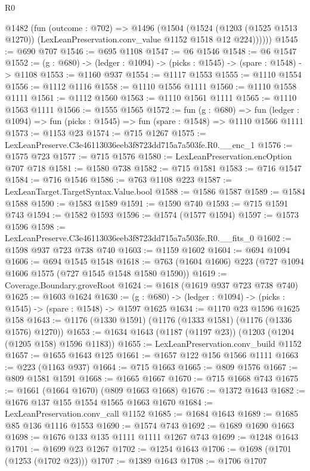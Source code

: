 \begin{lexlean}{R0}
\begin{coremodule}
      @1482
        (fun (outcome : @702) =>
        @1496
          (@1504
            (@1524
              (@1203 (@1525 @1513 @1270))
              (LexLeanPreservation.conv_value @1152 @1518 @12 @224))))))
@1545 := @690 @707
@1546 := @695 @1108
@1547 := @6 @1546
@1548 := @6 @1547
@1552 := (g : @680) -> (ledger : @1094) -> (picks : @1545) -> (spare : @1548) -> @1108
@1553 := @1160 @937
@1554 := @1117 @1553
@1555 := @1110 @1554
@1556 := @1112 @1116
@1558 := @1110 @1556 @1111
@1560 := @1110 @1558 @1111
@1561 := @1112 @1560
@1563 := @1110 @1561 @1111
@1565 := @1110 @1563 @1111
@1566 := @1555 @1565
@1572 := fun (g : @680) =>
  fun (ledger : @1094) => fun (picks : @1545) => fun (spare : @1548) => @1110 @1566 @1111
@1573 := @1153 @23
@1574 := @715 @1267
@1575 := LexLeanPreserve.C3e46113036eeb3f8723dd715a7a503fe.R0.__enc_1
@1576 := @1575 @723
@1577 := @715 @1576
@1580 := LexLeanPreservation.encOption @707 @718
@1581 := @1580 @738
@1582 := @715 @1581
@1583 := @716 @1547
@1584 := @716 @1546
@1586 := @763 @1108 @223
@1587 := LexLeanTarget.TargetSyntax.Value.bool
@1588 := @1586 @1587
@1589 := @1584 @1588
@1590 := @1583 @1589
@1591 := @1590 @740
@1593 := @715 @1591 @743
@1594 := @1582 @1593
@1596 := @1574 (@1577 @1594)
@1597 := @1573 @1596
@1598 := LexLeanPreserve.C3e46113036eeb3f8723dd715a7a503fe.R0.__fits_0
@1602 := @1598 @937 @723 @738 @740
@1603 := @1159 @1602
@1604 := @694 @1094
@1606 := @694 @1545 @1548
@1618 := @763 (@1604 @1606) @223 (@727 @1094 @1606 @1575 (@727 @1545 @1548 @1580 @1590))
@1619 := Coverage.Boundary.groveRoot
@1624 := @1618 (@1619 @937 @723 @738 @740)
@1625 := @1603 @1624
@1630 := (g : @680) -> (ledger : @1094) -> (picks : @1545) -> (spare : @1548) -> @1597 @1625
@1634 := @1170 @23 @1596 @1625 @158
@1643 := @1176 (@1330 @1591) (@1176 (@1333 @1581) (@1176 (@1336 @1576) @1270))
@1653 := @1634 @1643 (@1187 (@1197 @23)) (@1203 (@1204 (@1205 @158) @1596 @1183))
@1655 := LexLeanPreservation.conv_build @1152
@1657 := @1655 @1643 @125
@1661 := @1657 @122 @156 @1566 @1111
@1663 := @223 (@1163 @937)
@1664 := @715 @1663
@1665 := @809 @1576
@1667 := @809 @1581 @1591
@1668 := @1665 @1667
@1670 := @715 @1668 @743
@1675 := @1661 (@1664 @1670) (@809 @1663 @1668)
@1676 := @1372 @1643
@1682 := @1676 @137 @155 @1554 @1565 @1663 @1670
@1684 := LexLeanPreservation.conv_call @1152
@1685 := @1684 @1643
@1689 := @1685 @85 @136 @1116 @1553
@1690 := @1574 @743
@1692 := @1689 @1690 @1663
@1698 := @1676 @133 @135 @1111 @1111 @1267 @743
@1699 := @1248 @1643
@1701 := @1699 @23 @1267
@1702 := @1254 @1643
@1706 := @1698 (@1701 (@1253 (@1702 @23)))
@1707 := @1389 @1643
@1708 := @1706 @1707

\end{coremodule}
\end{lexlean}
